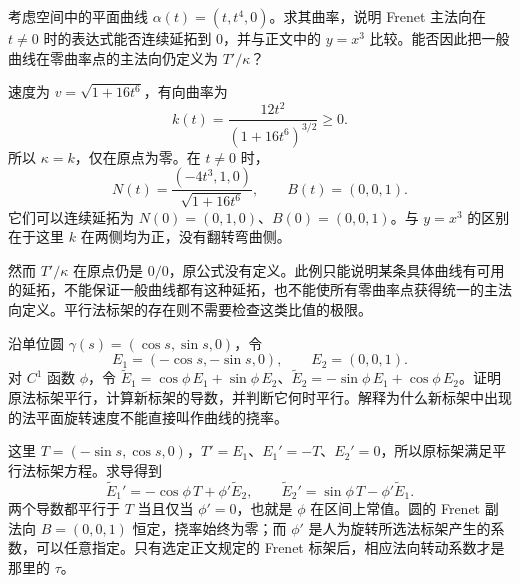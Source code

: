\begin{exercise}\label{g1:ex:quartic-zero-curvature}
	考虑空间中的平面曲线 \(\alpha(t)=(t,t^4,0)\)。求其曲率，说明 Frenet 主法向在 \(t\ne0\) 时的表达式能否连续延拓到 \(0\)，并与正文中的 \(y=x^3\) 比较。能否因此把一般曲线在零曲率点的主法向仍定义为 \(T'/\kappa\)？
\end{exercise}
\begin{solution}
	速度为 \(v=\sqrt{1+16t^6}\)，有向曲率为
	\[
		k(t)=\frac{12t^2}{(1+16t^6)^{3/2}}\ge0.
	\]
	所以 \(\kappa=k\)，仅在原点为零。在 \(t\ne0\) 时，
	\[
		N(t)=\frac{(-4t^3,1,0)}{\sqrt{1+16t^6}},\qquad B(t)=(0,0,1).
	\]
	它们可以连续延拓为 \(N(0)=(0,1,0)\)、\(B(0)=(0,0,1)\)。与 \(y=x^3\) 的区别在于这里 \(k\) 在两侧均为正，没有翻转弯曲侧。

	然而 \(T'/\kappa\) 在原点仍是 \(0/0\)，原公式没有定义。此例只能说明某条具体曲线有可用的延拓，不能保证一般曲线都有这种延拓，也不能使所有零曲率点获得统一的主法向定义。平行法标架的存在则不需要检查这类比值的极限。
\end{solution}

\begin{exercise}\label{g1:ex:rotating-normal-frame}
	沿单位圆 \(\gamma(s)=(\cos s,\sin s,0)\)，令
	\[
		E_1=(-\cos s,-\sin s,0),\qquad E_2=(0,0,1).
	\]
	对 \(C^1\) 函数 \(\phi\)，令 \(\widetilde E_1=\cos\phi\,E_1+\sin\phi\,E_2\)、\(\widetilde E_2=-\sin\phi\,E_1+\cos\phi\,E_2\)。证明原法标架平行，计算新标架的导数，并判断它何时平行。解释为什么新标架中出现的法平面旋转速度不能直接叫作曲线的挠率。
\end{exercise}
\begin{solution}
	这里 \(T=(-\sin s,\cos s,0)\)，\(T'=E_1\)、\(E_1'=-T\)、\(E_2'=0\)，所以原标架满足平行法标架方程。求导得到
	\[
		\widetilde E_1'=-\cos\phi\,T+\phi'\widetilde E_2,\qquad
		\widetilde E_2'=\sin\phi\,T-\phi'\widetilde E_1.
	\]
	两个导数都平行于 \(T\) 当且仅当 \(\phi'=0\)，也就是 \(\phi\) 在区间上常值。圆的 Frenet 副法向 \(B=(0,0,1)\) 恒定，挠率始终为零；而 \(\phi'\) 是人为旋转所选法标架产生的系数，可以任意指定。只有选定正文规定的 Frenet 标架后，相应法向转动系数才是那里的 \(\tau\)。
\end{solution}

